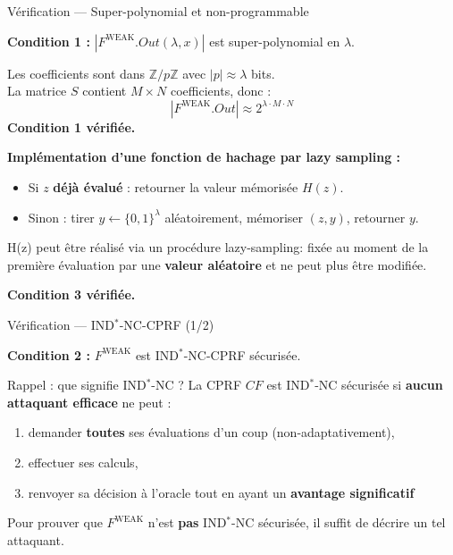 \documentclass{beamer}
\begin{document}
\begin{frame}{Vérification --- Super-polynomial et non-programmable}

\textbf{Condition 1 : } $|\mathit{F^{\mathrm{WEAK}}.Out}(\lambda, x)|$ est super-polynomial en $\lambda$.


Les coefficients sont dans $\mathbb{Z}/p\mathbb{Z}$ avec $|p| \approx \lambda$ bits.\\
La matrice $S$ contient $M \times N$ coefficients, donc :
\[
|\mathit{F^{\mathrm{WEAK}}.Out}| \approx 2^{\lambda \cdot M \cdot N}
\]
\textcolor{green!60!black}{\checkmark} \textbf{Condition 1 vérifiée.}

\vspace{0.3cm}

\textbf{Implémentation d'une fonction de hachage par lazy sampling :}
 
 
\begin{itemize}
    \item Si $z$ \textbf{déjà évalué} : retourner la valeur mémorisée $H(z)$.
    \item Sinon : tirer $y \leftarrow \{0,1\}^\lambda$ aléatoirement, mémoriser $(z, y)$, retourner $y$.
\end{itemize}
 

 
H(z) peut être réalisé via un procédure lazy-sampling: fixée au moment de la première évaluation par une \textbf{valeur aléatoire} et ne peut plus être modifiée.

 
\textcolor{green!60!black}{\Large\checkmark} \textbf{Condition 3 vérifiée.}


\end{frame}


\begin{frame}{Vérification --- IND$^*$-NC-CPRF (1/2)}
 
\textbf{Condition 2 :} $F^{\mathrm{WEAK}}$ est IND$^*$-NC-CPRF sécurisée.
 
\vspace{0.3cm}
 
\begin{block}{Rappel : que signifie IND$^*$-NC ?}
La CPRF $CF$ est IND$^*$-NC sécurisée si \textbf{aucun attaquant efficace} ne peut :
\begin{enumerate}
    \item demander \textbf{toutes} ses évaluations d'un coup (non-adaptativement),
    \item effectuer ses calculs,
    \item renvoyer sa décision à l'oracle tout en ayant un \textbf{avantage significatif}
\end{enumerate}
\end{block}
 
\vspace{0.3cm}
 
Pour prouver que $F^{\mathrm{WEAK}}$ n'est \textbf{pas} IND$^*$-NC sécurisée, il suffit de décrire un tel attaquant.
 
\end{frame}
 
\end{document}

